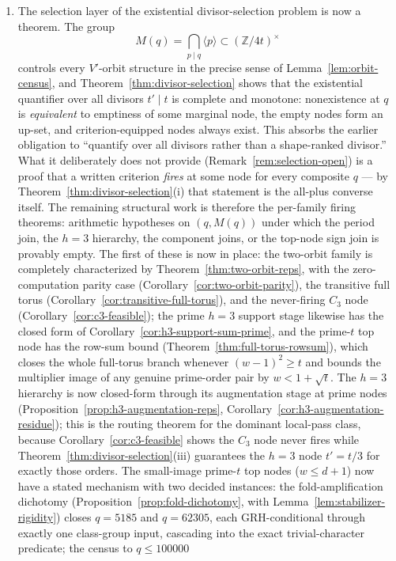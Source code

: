 \documentclass[11pt]{article}
\theoremstyle{plain}
\theoremstyle{definition}
\theoremstyle{remark}
\newcommand{\Z}{\mathbb Z}
\begin{document}
\begin{enumerate}
\item The selection layer of the existential divisor-selection problem is
now a theorem.  The group
\[
  M(q)=\bigcap_{p\mid q}\langle p\rangle\subset(\Z/4t)^\times
\]
controls every $V'$-orbit structure in the precise sense of
Lemma~\ref{lem:orbit-census}, and
Theorem~\ref{thm:divisor-selection} shows that the existential quantifier
over all divisors $t'\mid t$ is complete and monotone: nonexistence at $q$
is \emph{equivalent} to emptiness of some marginal node, the empty nodes
form an up-set, and criterion-equipped nodes always exist.  This absorbs
the earlier obligation to ``quantify over all divisors rather than a
shape-ranked divisor.''  What it deliberately does not provide
(Remark~\ref{rem:selection-open}) is a proof that a written criterion
\emph{fires} at some node for every composite $q$ --- by
Theorem~\ref{thm:divisor-selection}(i) that statement is the all-plus
converse itself.  The remaining structural work is therefore the
per-family firing theorems: arithmetic hypotheses on $(q,M(q))$ under
which the period join, the $h=3$ hierarchy, the component joins, or the
top-node sign join is provably empty.  The first of these is now in
place: the two-orbit family is completely characterized by
Theorem~\ref{thm:two-orbit-reps}, with the zero-computation parity case
(Corollary~\ref{cor:two-orbit-parity}), the transitive full torus
(Corollary~\ref{cor:transitive-full-torus}), and the never-firing $C_3$
node (Corollary~\ref{cor:c3-feasible}); the prime $h=3$ support stage
likewise has the closed form of
Corollary~\ref{cor:h3-support-sum-prime}, and the prime-$t$ top node has
the row-sum bound (Theorem~\ref{thm:full-torus-rowsum}), which closes the
whole full-torus branch whenever $(w-1)^2\ge t$ and bounds the multiplier
image of any genuine prime-order pair by $w<1+\sqrt t$.  The $h=3$
hierarchy is now closed-form through its augmentation stage at prime
nodes (Proposition~\ref{prop:h3-augmentation-reps},
Corollary~\ref{cor:h3-augmentation-residue}); this is the routing theorem
for the dominant local-pass class, because
Corollary~\ref{cor:c3-feasible} shows the $C_3$ node never fires while
Theorem~\ref{thm:divisor-selection}(iii) guarantees the $h=3$ node
$t'=t/3$ for exactly those orders.  The small-image prime-$t$ top nodes
($w\le d+1$) now have a stated mechanism with two decided instances:
the fold-amplification dichotomy
(Proposition~\ref{prop:fold-dichotomy}, with
Lemma~\ref{lem:stabilizer-rigidity}) closes $q=5185$ and $q=62305$,
each GRH-conditional through exactly one class-group input, cascading
into the exact trivial-character predicate; the census to $q\le100000$

\end{enumerate}
\end{document}
